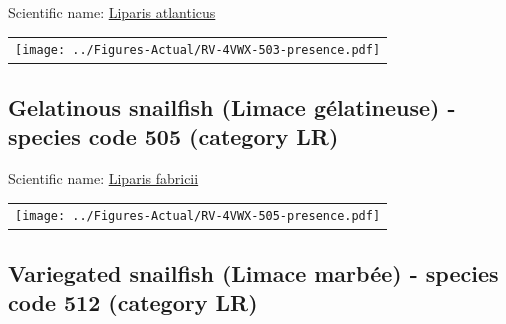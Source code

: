 \documentclass[12pt]{article}\usepackage[]{graphicx}\usepackage[]{color}
\begin{document}

Scientific name: \href{http://www.marinespecies.org/aphia.php?p=taxdetails\&id=159524}{Liparis atlanticus} \newline
\begin{minipage}{1.0\textwidth}
 \begin{tabular}{c}
\texttt{[image: ../Figures-Actual/RV-4VWX-503-presence.pdf]} \\ 
\end{tabular} 
\end{minipage}
\clearpage

\renewcommand\thefigure{\thesubsection\Alph{figure}}

\setcounter{figure}{0}

\hypertarget{sec:505}{%
\subsection{Gelatinous snailfish (Limace gélatineuse) - species code 505 (category LR)}\label{sec:505}}

  


Scientific name: \href{http://www.marinespecies.org/aphia.php?p=taxdetails\&id=127218}{Liparis fabricii} \newline
\begin{minipage}{1.0\textwidth}
 \begin{tabular}{c}
\texttt{[image: ../Figures-Actual/RV-4VWX-505-presence.pdf]} \\ 
\end{tabular} 
\end{minipage}
\clearpage

\renewcommand\thefigure{\thesubsection\Alph{figure}}

\setcounter{figure}{0}

\hypertarget{sec:512}{%
\subsection{Variegated snailfish (Limace marbée) - species code 512 (category LR)}\label{sec:512}}

  

\end{document}
